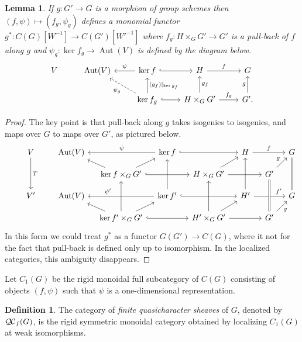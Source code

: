 \documentclass[11pt]{amsart}
\theoremstyle{plain}
\newtheorem{lemma}[theorem]{Lemma}
\theoremstyle{definition}
\newtheorem{definition}[theorem]{Definition}
\theoremstyle{remark}
\DeclareMathOperator{\Aut}{Aut}
\newcommand{\QC}{{\mathcal{Q\hskip-0.8pt C}}}
\newcommand{\QCf}{{\QC_f}}
\begin{document}
\begin{lemma}\label{lemma:finite-pull-back}
If $g : G'\to G$ is a morphism of group schemes then $(f,\psi) \mapsto (f_g,\psi_g)$
defines a monomial functor $g^* : C(G)[W^{-1}] \to C(G')[W'^{-1}]$ where $f_g : H\times_G G'\to G'$
is a pull-back of $f$ along $g$ and $\psi_g : \ker f_g \to \Aut(V)$ is defined by the diagram below.
\[
\begin{tikzcd}
V & \Aut(V) & \arrow[swap]{l}{\psi} \ker f \arrow[hook]{r} & H \arrow{r}{f} &  G\\
  &  & \arrow[dashed]{ul}{\psi_g} \arrow[swap]{u}{(g_f)\vert_{\ker g_f}} \ker f_g \arrow[hook]{r}
  & \arrow[swap]{u}{g_f} H\times_G G' \arrow{r}{f_g} & \arrow{u}{g} G'.
\end{tikzcd}
\]
\end{lemma}

\begin{proof}
The key point is that pull-back along $g$ takes isogenies to isogenies,
and maps over $G$ to maps over $G'$, as pictured below.
\[
\begin{tikzcd}[row sep=10,column sep=10]
\ & V \arrow{dd}{T} && \Aut(V) && \arrow[swap]{ll}{\psi} \ker f \arrow[hook]{rr} && H \arrow{rr}{f} && \arrow[equal]{dd} G\\
 && && \arrow{ul} \ker f\times_G G' \arrow{ur} \arrow[hook]{rr} && H\times_G G' \arrow{ur} \arrow{rr} && G' \arrow{ur}{g} & \\
& V' && \Aut(V) && \arrow[swap,pos=0.7]{ll}{\psi'} \arrow[swap]{uu}{} \ker f'  \arrow[hook]{rr} && \arrow[swap]{uu} H' \arrow[pos=0.8]{rr}{f'} && G\\
 && && \arrow{ul} \ker f'\times_G G' \arrow{uu} \arrow{ur} \arrow[hook]{rr} && \arrow{uu} H'\times_G G' \arrow{ur} \arrow{rr} && \arrow[equals]{uu} G' \arrow[swap]{ur}{g} & 
\end{tikzcd}
\]
In this form we could treat $g^*$ as a functor $G(G')\to C(G)$,
where it not for the fact that pull-back is defined only up to isomorphism.
In the localized categories, this ambiguity disappears. 
\end{proof}

Let $C_1(G)$ be the rigid monoidal full subcategory of $C(G)$ consisting of objects
$(f,\psi)$ such that $\psi$ is a one-dimensional representation.

\begin{definition}
The category of \emph{finite quasicharacter sheaves} of $G$, denoted by $\QCf(G)$,
is the rigid symmetric monoidal category obtained by localizing $C_1(G)$ at weak isomorphisms.
\end{definition}
\end{document}
